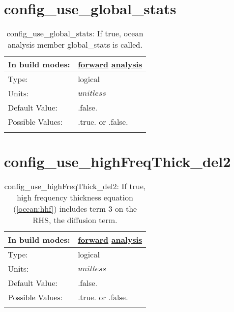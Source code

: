 \section[config\_use\_global\_stats]{config\_use\_global\_stats}
\label{sec:nm_sec_config_use_global_stats}
\begin{center}
\begin{longtable}{| p{2.0in} || p{4.0in} |}
    \hline
    In build modes: & \hyperref[subsec:forward_nm_tab_global_stats]{forward} \hyperref[subsec:analysis_nm_tab_global_stats]{analysis} \\
    \hline
    Type: & logical \\
    \hline
    Units: & $unitless$ \\
    \hline
    Default Value: & .false. \\
    \hline
    Possible Values: & .true. or .false. \\
    \hline
    \caption{config\_use\_global\_stats: If true, ocean analysis member global\_stats is called.}
\end{longtable}
\end{center}
\section[config\_use\_highFreqThick\_del2]{config\_use\_highFreqThick\_del2}
\label{sec:nm_sec_config_use_highFreqThick_del2}
\begin{center}
\begin{longtable}{| p{2.0in} || p{4.0in} |}
    \hline
    In build modes: & \hyperref[subsec:forward_nm_tab_ALE_frequency_filtered_thickness]{forward} \hyperref[subsec:analysis_nm_tab_ALE_frequency_filtered_thickness]{analysis} \\
    \hline
    Type: & logical \\
    \hline
    Units: & $unitless$ \\
    \hline
    Default Value: & .false. \\
    \hline
    Possible Values: & .true. or .false. \\
    \hline
    \caption{config\_use\_highFreqThick\_del2: If true, high frequency thickness equation (\ref{ocean:hhf}) includes term 3 on the RHS, the diffusion term.}
\end{longtable}
\end{center}
